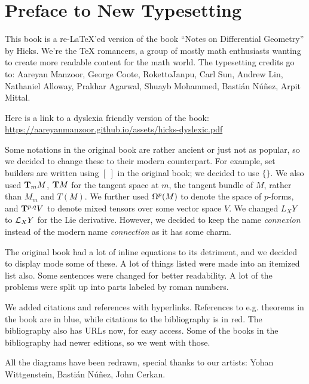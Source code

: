\documentclass[main]{subfiles}
\begin{document}
\chapter*{Preface to New Typesetting}

This book is a re-LaTeX'ed version of the book ``Notes on Differential Geometry'' by Hicks. We're the \TeX
{}romancers, a group of mostly math enthusiasts wanting to create more readable content for the math world. The typesetting credits go to: Aareyan Manzoor, George Coote, RokettoJanpu, Carl Sun, Andrew Lin, Nathaniel Alloway, Prakhar Agarwal, Shuayb Mohammed, Bastián Núñez, Arpit Mittal. %

Here is a link to a dyslexia friendly version of the book: \url{https://aareyanmanzoor.github.io/assets/hicks-dyslexic.pdf}

Some notations in the original book are rather ancient or just not as popular, so we decided to change these to their modern counterpart. For example, set builders are written using $[~]$ in the original book; we decided to use $\{\}$. We also used $\tangentspace{M}{m}$, $\tangentbundle{M}$ for the tangent space at $m$, the tangent bundle of $M$, rather than $M_m$ and $T(M)$. We further used $\formbundle{M}{p}$ to denote the space of $p$-forms, and $\tensorbundle{}{p}{q}V$ to denote mixed tensors over some vector space $V$. We changed $L_XY$ to $\liederiv{X}Y$ for the Lie derivative. However, we decided to keep the name \emph{connexion} instead of the modern name \emph{connection} as it has some charm.

The original book had a lot of inline equations to its detriment, and we decided to display mode some of these. A lot of things listed were made into an itemized list also. Some sentences were changed for better readability. A lot of the problems were split up into parts labeled by roman numbers.

We added citations and references with hyperlinks. References to e.g. theorems in the book are in blue, while citations to the bibliography is in red. The bibliography also has URLs now, for easy access. Some of the books in the bibliography  had newer editions, so we went with those.

All the diagrams have been redrawn, special thanks to our artists: Yohan Wittgenstein, Bastián Núñez, John Cerkan. %
\end{document}
